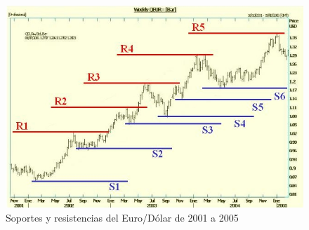 \begin{figure}[H]
	\centering
	\includegraphics[scale=0.45]{imagenes/SoportesResistencias.png}
	\caption{\label{fig:SoportesResistencias}Soportes y resistencias del Euro/Dólar de 2001 a 2005}
\end{figure}

